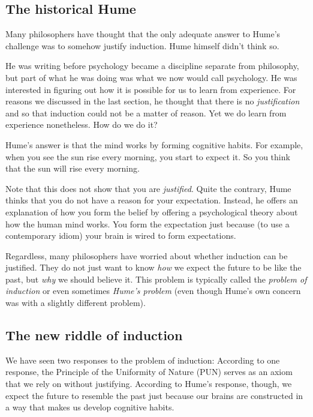 \documentclass[]{article}
\begin{document}
\subsection{The historical Hume}

Many philosophers have thought that the only adequate answer to Hume's challenge was to somehow justify induction. Hume himself didn't think so.

He was writing before psychology became a discipline separate from philosophy, but part of what he was doing was what we now would call psychology. He was interested in figuring out how it is possible for us to learn from experience. For reasons we discussed in the last section, he thought that there is no \emph{justification} and so that induction could not be a matter of reason. Yet we do learn from experience nonetheless. How do we do it?

Hume's answer is that the mind works by forming cognitive habits. For example, when you see the sun rise every morning, you start to expect it. So you think that the sun will rise every morning.

Note that this does not show that you are \emph{justified}. Quite the contrary, Hume thinks that you do not have a reason for your expectation. Instead, he offers an explanation of how you form the belief by offering a psychological theory about how the human mind works. You form the expectation just because (to use a contemporary idiom) your brain is wired to form expectations.

Regardless, many philosophers have worried about whether induction can be justified. They do not just want to know \emph{how} we expect the future to be like the past, but \emph{why} we should believe it. This problem is typically called the \emph{problem of induction} or even sometimes \emph{Hume's problem} (even though Hume's own concern was with a slightly different problem).

\subsection{The new riddle of induction}

We have seen two responses to the problem of induction: According to one response, the Principle of the Uniformity of Nature (PUN) serves as an axiom that we rely on without justifying. According to Hume's response, though, we expect the future to resemble the past just because our brains are constructed in a way that makes us develop cognitive habits.
\end{document}
